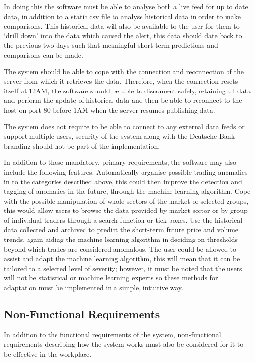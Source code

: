 \documentclass[11pt, oneside, a4paper]{article}
\begin{document}
In doing this the software must be able to analyse both a live feed for up to date data, in addition to a static
csv file to analyse historical data in order to make comparisons. This historical data will also be available to
the user for them to ‘drill down’ into the data which caused the alert, this data should date back to the previous
two days such that meaningful short term predictions and comparisons can be made.

The system should be able to cope with the connection and reconnection of the server from which it retrieves the
data. Therefore, when the connection resets itself at 12AM, the software should be able to disconnect safely,
retaining all data and perform the update of historical data and then be able to reconnect to the host on port 80
before 1AM when the server resumes publishing data.

The system does not require to be able to connect to any external data feeds or support multiple users, security
of the system along with the Deutsche Bank branding should not be part of the implementation.

In addition to these mandatory, primary requirements, the software may also include the following features:
Automatically organise possible trading anomalies in to the categories described above, this could then improve
the detection and tagging of anomalies in the future, through the machine learning algorithm. Cope with the
possible manipulation of whole sectors of the market or selected groups, this would allow users to browse the
data provided by market sector or by group of individual traders through a search function or tick boxes. Use
the historical data collected and archived to predict the short-term future price and volume trends, again
aiding the machine learning algorithm in deciding on thresholds beyond which trades are considered anomalous.
The user could be allowed to assist and adapt the machine learning algorithm, this will mean that it can be
tailored to a selected level of severity; however, it must be noted that the users will not be statistical or
machine learning experts so these methods for adaptation must be implemented in a simple, intuitive way.

\subsection{Non-Functional Requirements}
In addition to the functional requirements of the system, non-functional requirements describing how the system
works must also be considered for it to be effective in the workplace.
\end{document}
